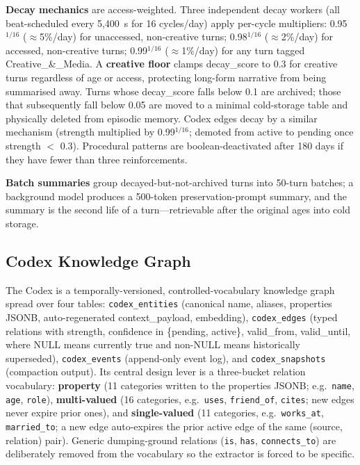 \documentclass[11pt,a4paper]{article}
\begin{document}
\textbf{Decay mechanics} are access-weighted. Three independent decay workers (all beat-scheduled every 5{,}400~s for 16 cycles/day) apply per-cycle multipliers: 0.95$^{1/16}$ ($\approx$5\%/day) for unaccessed, non-creative turns; 0.98$^{1/16}$ ($\approx$2\%/day) for accessed, non-creative turns; 0.99$^{1/16}$ ($\approx$1\%/day) for any turn tagged Creative\_\&\_Media. A \textbf{creative floor} clamps decay\_score to 0.3 for creative turns regardless of age or access, protecting long-form narrative from being summarised away. Turns whose decay\_score falls below 0.1 are archived; those that subsequently fall below 0.05 are moved to a minimal cold-storage table and physically deleted from episodic memory. Codex edges decay by a similar mechanism (strength multiplied by 0.99$^{1/16}$; demoted from active to pending once strength $<$ 0.3). Procedural patterns are boolean-deactivated after 180 days if they have fewer than three reinforcements.

\textbf{Batch summaries} group decayed-but-not-archived turns into 50-turn batches; a background model produces a 500-token preservation-prompt summary, and the summary is the second life of a turn---retrievable after the original ages into cold storage.

\subsection{Codex Knowledge Graph}

The Codex is a temporally-versioned, controlled-vocabulary knowledge graph spread over four tables: \texttt{codex\_entities} (canonical name, aliases, properties JSONB, auto-regenerated context\_payload, embedding), \texttt{codex\_edges} (typed relations with strength, confidence in \{pending, active\}, valid\_from, valid\_until, where NULL means currently true and non-NULL means historically superseded), \texttt{codex\_events} (append-only event log), and \texttt{codex\_snapshots} (compaction output). Its central design lever is a three-bucket relation vocabulary: \textbf{property} (11 categories written to the properties JSONB; e.g.\ \texttt{name}, \texttt{age}, \texttt{role}), \textbf{multi-valued} (16 categories, e.g.\ \texttt{uses}, \texttt{friend\_of}, \texttt{cites}; new edges never expire prior ones), and \textbf{single-valued} (11 categories, e.g.\ \texttt{works\_at}, \texttt{married\_to}; a new edge auto-expires the prior active edge of the same (source, relation) pair). Generic dumping-ground relations (\texttt{is}, \texttt{has}, \texttt{connects\_to}) are deliberately removed from the vocabulary so the extractor is forced to be specific.
\end{document}
